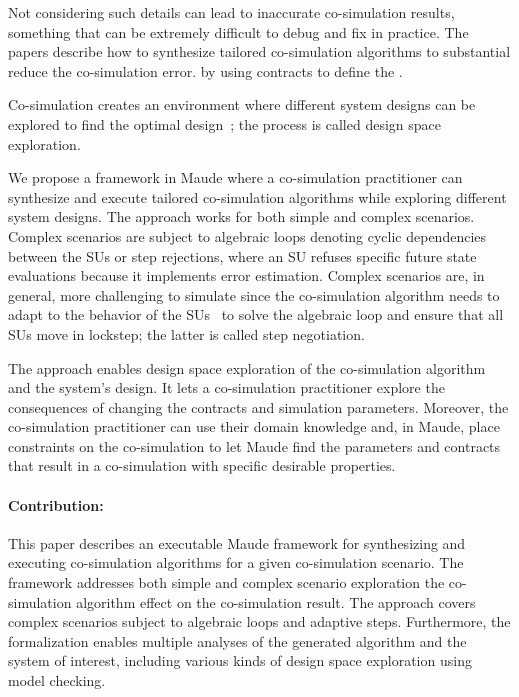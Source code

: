 Not considering such details can lead to inaccurate co-simulation results, something that can be extremely difficult to debug and fix in practice.
The papers \cite{Gomes2019,Oakes2021,thrane2021} describe how to synthesize tailored co-simulation algorithms to substantial reduce the co-simulation error. by using contracts to define the .

Co-simulation creates an environment where different system designs can be explored to find the optimal design~\cite{dse,gamble_design_2014}; the process is called design space exploration.

We propose a framework in Maude where a co-simulation practitioner can synthesize and execute tailored co-simulation algorithms while exploring different system designs.
The approach works for both simple and complex scenarios.
Complex scenarios are subject to algebraic loops denoting cyclic dependencies between the SUs or step rejections, where an  SU refuses specific future state evaluations because it implements error estimation.
Complex scenarios are, in general, more challenging to simulate since the co-simulation algorithm needs to adapt to the behavior of the SUs~\cite{thrane2021} to solve the algebraic loop and ensure that all SUs move in lockstep; the latter is called step negotiation. 

The approach enables design space exploration of the co-simulation algorithm and the system's design.
It lets a co-simulation practitioner explore the consequences of changing the contracts and simulation parameters.
Moreover, the co-simulation practitioner can use their domain knowledge and, in Maude, place constraints on the co-simulation to let Maude find the parameters and contracts that result in a co-simulation with specific desirable properties. 

\paragraph{Contribution:}
This paper describes an executable Maude framework for synthesizing and executing co-simulation algorithms for a given co-simulation scenario.
The framework addresses both simple and complex scenario  exploration the co-simulation algorithm effect on the co-simulation result.
The approach covers complex scenarios subject to algebraic loops and adaptive steps.
Furthermore, the formalization enables multiple analyses of the generated algorithm and the system of interest, including various kinds of design space exploration using model checking. 

